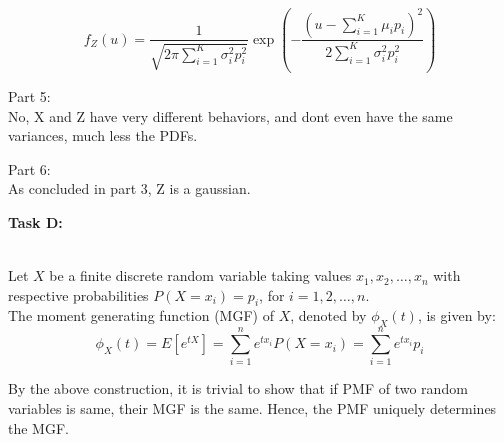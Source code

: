 \documentclass[a4paper,12pt,answers]{exam}
\begin{document}
\begin{questions}
\begin{solution}
\[
f_Z(u) = \frac{1}{\sqrt{2\pi \sum_{i=1}^K \sigma_i^2 p_i^2}} \exp\left(-\frac{(u - \sum_{i=1}^K \mu_i p_i)^2}{2 \sum_{i=1}^K \sigma_i^2 p_i^2}\right)
\]

Part 5: \\
No, X and Z have very different behaviors, and dont even have the same variances, much less the PDFs.

Part 6:\\
As concluded in part 3, Z is a gaussian.
\end{solution}

\textbf{Task D:}
\begin{solution}\\
Let $X$ be a finite discrete random variable taking values $x_1, x_2, \dots, x_n$ with respective probabilities $P(X = x_i) = p_i$, for $i = 1, 2, \dots, n$.\\



The moment generating function (MGF) of $X$, denoted by $\phi_X(t)$, is given by:
\[
\phi_X(t) = E[e^{tX}] = \sum_{i=1}^n e^{t x_i} P(X = x_i) = \sum_{i=1}^n e^{t x_i} p_i
\]

By the above construction, it is trivial to show that if PMF of two random variables is same, their MGF is the same. Hence, the PMF uniquely determines the MGF.



\end{solution}
\end{questions}
\end{document}
